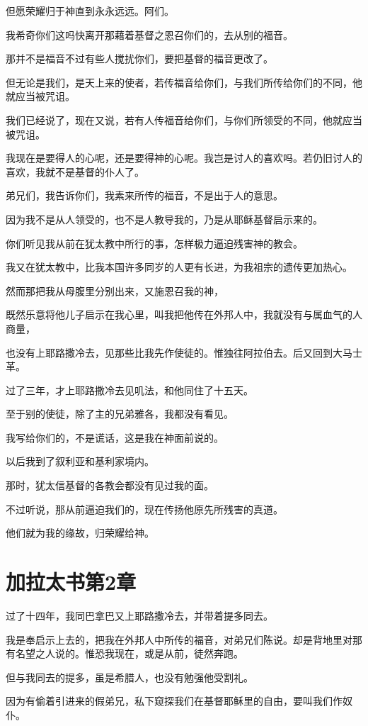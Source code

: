 \documentclass[12pt,oneside]{book}
\begin{document}
但愿荣耀归于神直到永永远远。阿们。

我希奇你们这吗快离开那藉着基督之恩召你们的，去从别的福音。

那并不是福音不过有些人搅扰你们，要把基督的福音更改了。

但无论是我们，是天上来的使者，若传福音给你们，与我们所传给你们的不同，他就应当被咒诅。

我们已经说了，现在又说，若有人传福音给你们，与你们所领受的不同，他就应当被咒诅。

我现在是要得人的心呢，还是要得神的心呢。我岂是讨人的喜欢吗。若仍旧讨人的喜欢，我就不是基督的仆人了。

弟兄们，我告诉你们，我素来所传的福音，不是出于人的意思。

因为我不是从人领受的，也不是人教导我的，乃是从耶稣基督启示来的。

你们听见我从前在犹太教中所行的事，怎样极力逼迫残害神的教会。

我又在犹太教中，比我本国许多同岁的人更有长进，为我祖宗的遗传更加热心。

然而那把我从母腹里分别出来，又施恩召我的神，

既然乐意将他儿子启示在我心里，叫我把他传在外邦人中，我就没有与属血气的人商量，

也没有上耶路撒冷去，见那些比我先作使徒的。惟独往阿拉伯去。后又回到大马士革。

过了三年，才上耶路撒冷去见叽法，和他同住了十五天。

至于别的使徒，除了主的兄弟雅各，我都没有看见。

我写给你们的，不是谎话，这是我在神面前说的。

以后我到了叙利亚和基利家境内。

那时，犹太信基督的各教会都没有见过我的面。

不过听说，那从前逼迫我们的，现在传扬他原先所残害的真道。

他们就为我的缘故，归荣耀给神。

\chapter{加拉太书第2章}
过了十四年，我同巴拿巴又上耶路撒冷去，并带着提多同去。

我是奉启示上去的，把我在外邦人中所传的福音，对弟兄们陈说。却是背地里对那有名望之人说的。惟恐我现在，或是从前，徒然奔跑。

但与我同去的提多，虽是希腊人，也没有勉强他受割礼。

因为有偷着引进来的假弟兄，私下窥探我们在基督耶稣里的自由，要叫我们作奴仆。
\end{document}
